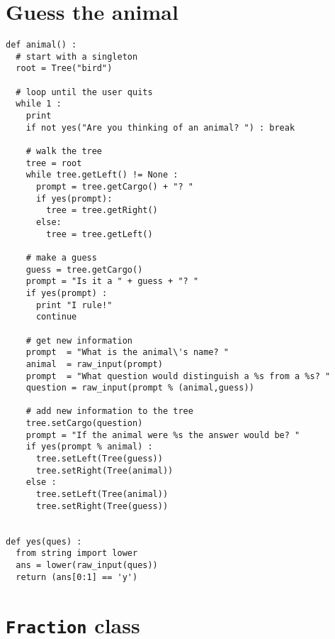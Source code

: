 \section{Guess the animal}

\begin{verbatim}
def animal() :
  # start with a singleton
  root = Tree("bird")

  # loop until the user quits
  while 1 :
    print
    if not yes("Are you thinking of an animal? ") : break

    # walk the tree
    tree = root
    while tree.getLeft() != None :
      prompt = tree.getCargo() + "? "
      if yes(prompt):
        tree = tree.getRight()
      else:
        tree = tree.getLeft()

    # make a guess
    guess = tree.getCargo()
    prompt = "Is it a " + guess + "? "
    if yes(prompt) :
      print "I rule!"
      continue

    # get new information
    prompt  = "What is the animal\'s name? "
    animal  = raw_input(prompt)
    prompt  = "What question would distinguish a %s from a %s? "
    question = raw_input(prompt % (animal,guess))

    # add new information to the tree
    tree.setCargo(question)
    prompt = "If the animal were %s the answer would be? "
    if yes(prompt % animal) :
      tree.setLeft(Tree(guess))
      tree.setRight(Tree(animal))
    else :
      tree.setLeft(Tree(animal))
      tree.setRight(Tree(guess))


def yes(ques) :
  from string import lower
  ans = lower(raw_input(ques))
  return (ans[0:1] == 'y')
\end{verbatim}

\section{{\tt Fraction} class}

